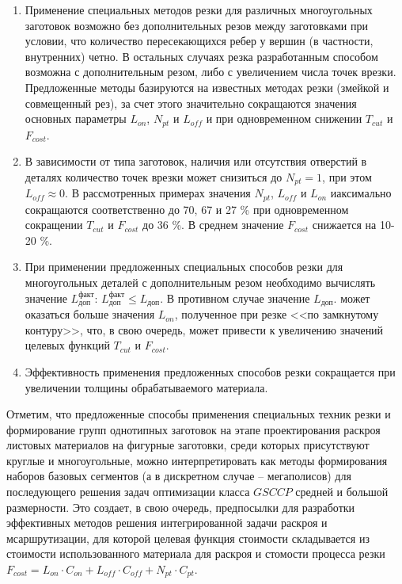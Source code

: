 \documentclass[11pt,twoside,openany]{report}
\begin{document}
\begin{enumerate}
\item
Применение специальных методов резки
для различных многоугольных заготовок возможно
без дополнительных резов между заготовками при условии,
что количество пересекающихся ребер у вершин
(в частности, внутренних) четно.
В остальных случаях резка разработанным
способом возможна с дополнительным резом,
либо с увеличением числа точек врезки.
Предложенные методы базируются на известных методах резки
(змейкой и совмещенный рез),
за счет этого значительно сокращаются
значения основных параметры
$L_{on}$, $N_{pt}$  и $L_{off}$
и   при одновременном снижении
$T_{cut}$
и
$F_{cost}$.

\item
В зависимости от типа заготовок,
наличия или отсутствия отверстий в деталях
количество точек врезки может снизиться до
$N_{pt}=1$,
при этом
$L_{off} \approx 0$.
В рассмотренных примерах значения
$N_{pt}$, $L_{off}$ и $L_{on}$
иаксимально сокращаются соответственно до 70, 67 и 27 \%
при одновременном сокращении
$T_{cut}$
и
$F_{cost}$
до 36 \%.
В среднем значение $F_{cost}$ снижается на 10-20 \%.

\item
При применении предложенных специальных способов резки
для многоугольных деталей с дополнительным резом
необходимо вычислять значение
$L_\text{доп}^\text{факт}$:
$L_\text{доп}^\text{факт} \leqslant L_\text{доп}$.
В противном случае значение
$L_\text{доп}$.
может оказаться больше значения
$L_{on}$,
полученное при резке <<по замкнутому контуру>>,
что,
в свою очередь,
может привести к увеличению значений целевых функций
$T_{cut}$
и
$F_{cost}$.

\item Эффективность применения предложенных способов резки
сокращается при увеличении толщины обрабатываемого материала.
\end{enumerate}

Отметим, что
предложенные способы применения специальных техник резки и
формирование групп однотипных заготовок на этапе
проектирования раскроя листовых материалов на фигурные заготовки,
среди которых присутствуют круглые и многоугольные,
можно интерпретировать как методы формирования наборов базовых сегментов
(а в дискретном случае – мегаполисов)
для последующего решения задач оптимизации класса
$GSCCP$
средней и большой размерности.
Это создает,
в свою очередь,
предпосылки  для разработки эффективных методов
решения интегрированной задачи раскроя и мсаршрутизации,
для которой целевая функция стоимости складывается
из стоимости использованного материала для раскроя
и стомости процесса резки
$
F_{cost}=
L_{on} \cdot C_{on} +
L_{off} \cdot C_{off} +
N_{pt} \cdot C_{pt}
$.
\end{document}
